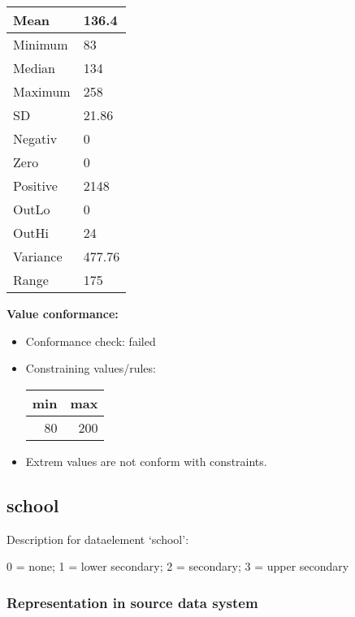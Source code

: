 \documentclass[
]{article}
\providecommand{\tightlist}{%
  \setlength{\itemsep}{0pt}\setlength{\parskip}{0pt}}
\begin{document}
\begin{table}[H]
\centering
\begin{tabular}{l|l}
\hline
Mean & 136.4\\
\hline
Minimum & 83\\
\hline
Median & 134\\
\hline
Maximum & 258\\
\hline
SD & 21.86\\
\hline
Negativ & 0\\
\hline
Zero & 0\\
\hline
Positive & 2148\\
\hline
OutLo & 0\\
\hline
OutHi & 24\\
\hline
Variance & 477.76\\
\hline
Range & 175\\
\hline
\end{tabular}
\end{table}

\textbf{Value conformance:}

\begin{itemize}
\tightlist
\item
  Conformance check: failed
\item
  Constraining values/rules:

  \begin{table}[H]
  \centering
  \begin{tabular}{r|r}
  \hline
  \textbf{min} & \textbf{max}\\
  \hline
  80 & 200\\
  \hline
  \end{tabular}
  \end{table}
\item
  Extrem values are not conform with constraints.
\end{itemize}

\newpage

\hypertarget{school}{%
\subsection{school}\label{school}}

Description for dataelement `school':

0 = none; 1 = lower secondary; 2 = secondary; 3 = upper secondary

\hypertarget{representation-in-source-data-system-23}{%
\subsubsection{\texorpdfstring{Representation in \textbf{source} data
system}{Representation in source data system}}\label{representation-in-source-data-system-23}}
\end{document}

